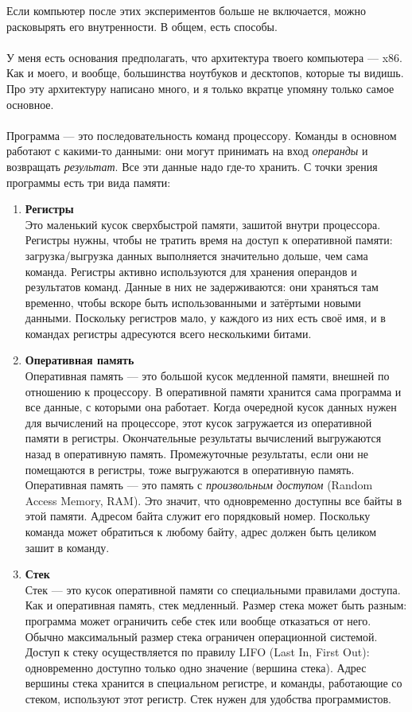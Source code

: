 \documentclass[11pt]{book}
\begin{document}
Если компьютер после этих экспериментов больше не включается, можно расковырять его внутренности.
В общем, есть способы.
\\ \\
У меня есть основания предполагать, что архитектура твоего компьютера --- x86.
Как и моего, и вообще, большинства ноутбуков и десктопов, которые ты видишь.
Про эту архитектуру написано много, и я только вкратце упомяну только самое основное.
\\ \\
Программа --- это последовательность команд процессору.
Команды в основном работают с какими-то данными:
они могут принимать на вход \emph{операнды} и возвращать \emph{результат}.
Все эти данные надо где-то хранить.
С точки зрения программы есть три вида памяти:
\begin{enumerate}
\item \textbf{Регистры}
\\
Это маленький кусок сверхбыстрой памяти, зашитой внутри процессора.
Регистры нужны, чтобы не тратить время на доступ к оперативной памяти: загрузка/выгрузка данных выполняется значительно дольше, чем сама команда.
Регистры активно используются для хранения операндов и результатов команд.
Данные в них не задерживаются: они храняться там временно, чтобы вскоре быть использованными и затёртыми новыми данными.
Поскольку регистров мало, у каждого из них есть своё имя, и в командах регистры адресуются всего несколькими битами.
\item \textbf{Оперативная память}
\\
Оперативная память --- это большой кусок медленной памяти, внешней по отношению к процессору.
В оперативной памяти хранится сама программа и все данные, с которыми она работает.
Когда очередной кусок данных нужен для вычислений на процессоре, этот кусок загружается из оперативной памяти в регистры.
Окончательные результаты вычислений выгружаются назад в оперативную память.
Промежуточные результаты, если они не помещаются в регистры, тоже выгружаются в оперативную память.
Оперативная память --- это память с \emph{произвольным доступом} (Random Access Memory, RAM).
Это значит, что одновременно доступны все байты в этой памяти.
Адресом байта служит его порядковый номер.
Поскольку команда может обратиться к любому байту, адрес должен быть целиком зашит в команду.
\item \textbf{Стек}
\\
Стек --- это кусок оперативной памяти со специальными правилами доступа.
Как и оперативная память, стек медленный. Размер стека может быть разным: программа может ограничить себе стек или вообще отказаться от него.
Обычно максимальный размер стека ограничен операционной системой.
Доступ к стеку осуществляется по правилу LIFO (Last In, First Out): одновременно доступно только одно значение (вершина стека).
Адрес вершины стека хранится в специальном регистре, и команды, работающие со стеком, используют этот регистр.
Стек нужен для удобства программистов.
\end{enumerate}
\end{document}
